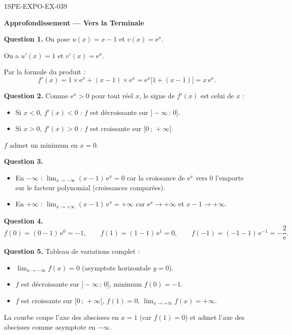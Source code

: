 \begin{corrige}{1SPE-EXPO-EX-039}
\begin{center}\textbf{Approfondissement — Vers la Terminale}\end{center}

\textbf{Question 1.} On pose $u(x) = x - 1$ et $v(x) = \mathrm{e}^{x}$.

On a $u'(x) = 1$ et $v'(x) = \mathrm{e}^{x}$.

Par la formule du produit :
\[f'(x) = 1 \times \mathrm{e}^{x} + (x-1) \times \mathrm{e}^{x} = \mathrm{e}^{x}\bigl[1 + (x-1)\bigr] = \boxed{x\,\mathrm{e}^{x}}.\]

\textbf{Question 2.} Comme $\mathrm{e}^{x} > 0$ pour tout réel $x$, le signe de $f'(x)$ est celui de $x$ :
\begin{itemize}
\item Si $x < 0$, $f'(x) < 0$ : $f$ est décroissante sur $]-\infty\,;\,0]$.
\item Si $x > 0$, $f'(x) > 0$ : $f$ est croissante sur $[0\,;\,+\infty[$.
\end{itemize}
$f$ admet un minimum en $x = 0$.

\textbf{Question 3.}
\begin{itemize}
\item En $-\infty$ : $\displaystyle\lim_{x \to -\infty} (x-1)\,\mathrm{e}^{x} = 0$ car la croissance de $\mathrm{e}^{x}$ vers $0$ l'emporte sur le facteur polynomial (croissances comparées).
\item En $+\infty$ : $\displaystyle\lim_{x \to +\infty} (x-1)\,\mathrm{e}^{x} = +\infty$ car $\mathrm{e}^{x} \to +\infty$ et $x - 1 \to +\infty$.
\end{itemize}

\textbf{Question 4.}
\[f(0) = (0-1)\,\mathrm{e}^{0} = -1, \qquad f(1) = (1-1)\,\mathrm{e}^{1} = 0, \qquad f(-1) = (-1-1)\,\mathrm{e}^{-1} = -\frac{2}{\mathrm{e}}.\]

\textbf{Question 5.} Tableau de variations complet :
\begin{itemize}
\item $\displaystyle\lim_{x \to -\infty} f(x) = 0$ (asymptote horizontale $y = 0$).
\item $f$ est décroissante sur $]-\infty\,;\,0]$, minimum $f(0) = -1$.
\item $f$ est croissante sur $[0\,;\,+\infty[$, $f(1) = 0$, $\displaystyle\lim_{x \to +\infty} f(x) = +\infty$.
\end{itemize}
La courbe coupe l'axe des abscisses en $x = 1$ (car $f(1) = 0$) et admet l'axe des abscisses comme asymptote en $-\infty$.
\end{corrige}
